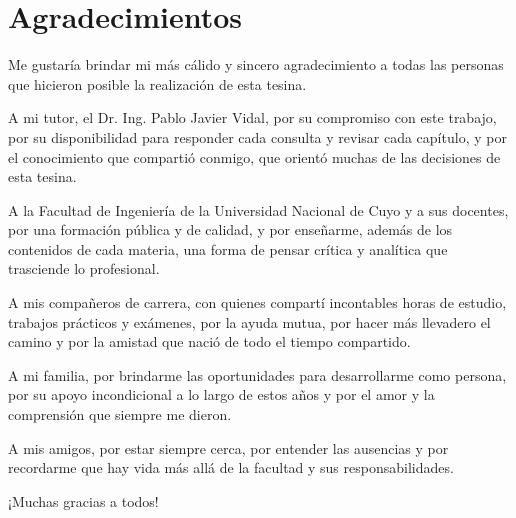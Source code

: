 \chapter*{Agradecimientos}
Me gustaría brindar mi más cálido y sincero agradecimiento a todas las personas que hicieron posible la realización de esta tesina.

A mi tutor, el Dr. Ing. Pablo Javier Vidal, por su compromiso con este trabajo, por su disponibilidad para responder
cada consulta y revisar cada capítulo, y por el conocimiento que compartió conmigo, que orientó muchas de las
decisiones de esta tesina.

A la Facultad de Ingeniería de la Universidad Nacional de Cuyo y a sus docentes, por una formación pública y de
calidad, y por enseñarme, además de los contenidos de cada materia, una forma de pensar crítica y analítica que
trasciende lo profesional.

A mis compañeros de carrera, con quienes compartí incontables horas de estudio, trabajos prácticos y exámenes, por
la ayuda mutua, por hacer más llevadero el camino y por la amistad que nació de todo el tiempo compartido.

A mi familia, por brindarme las oportunidades para desarrollarme como persona, por su apoyo incondicional a lo largo de
estos años y por el amor y la comprensión que siempre me dieron.

A mis amigos, por estar siempre cerca, por entender las ausencias y por recordarme que hay vida más allá de la facultad y
sus responsabilidades.

¡Muchas gracias a todos!